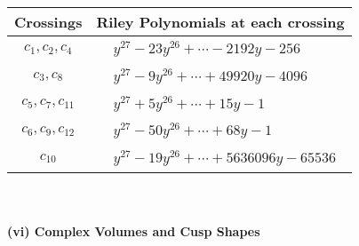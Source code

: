 \documentclass[1p]{elsarticle_modified}
\theoremstyle{definition}
\begin{document}
\begin{tabular}{m{50pt}|m{274pt}}
Crossings & \hspace{64pt}Riley Polynomials at each crossing \\
\hline $$\begin{aligned}c_{1},c_{2},c_{4}\end{aligned}$$&$\begin{aligned}
&y^{27}-23 y^{26}+\cdots-2192 y-256
\end{aligned}$\\
\hline $$\begin{aligned}c_{3},c_{8}\end{aligned}$$&$\begin{aligned}
&y^{27}-9 y^{26}+\cdots+49920 y-4096
\end{aligned}$\\
\hline $$\begin{aligned}c_{5},c_{7},c_{11}\end{aligned}$$&$\begin{aligned}
&y^{27}+5 y^{26}+\cdots+15 y-1
\end{aligned}$\\
\hline $$\begin{aligned}c_{6},c_{9},c_{12}\end{aligned}$$&$\begin{aligned}
&y^{27}-50 y^{26}+\cdots+68 y-1
\end{aligned}$\\
\hline $$\begin{aligned}c_{10}\end{aligned}$$&$\begin{aligned}
&y^{27}-19 y^{26}+\cdots+5636096 y-65536
\end{aligned}$\\
\hline
\end{tabular}\\~\\
\newpage\flushleft \textbf{(vi) Complex Volumes and Cusp Shapes}
\end{document}
